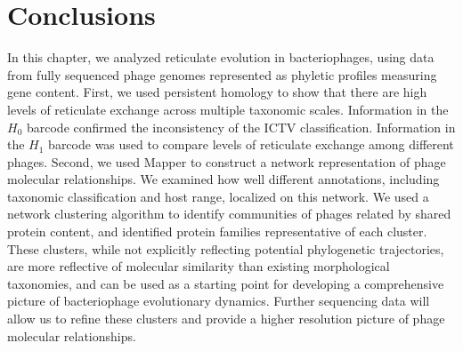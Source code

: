 \section{Conclusions}
\label{phage:sec:conclusions}

In this chapter, we analyzed reticulate evolution in bacteriophages, using data from fully sequenced phage genomes represented as phyletic profiles measuring gene content.
First, we used persistent homology to show that there are high levels of reticulate exchange across multiple taxonomic scales.
Information in the $H_0$ barcode confirmed the inconsistency of the ICTV classification.
Information in the $H_1$ barcode was used to compare levels of reticulate exchange among different phages.
Second, we used Mapper to construct a network representation of phage molecular relationships.
We examined how well different annotations, including taxonomic classification and host range, localized on this network.
We used a network clustering algorithm to identify communities of phages related by shared protein content, and identified protein families representative of each cluster.
These clusters, while not explicitly reflecting potential phylogenetic trajectories, are more reflective of molecular similarity than existing morphological taxonomies, and can be used as a starting point for developing a comprehensive picture of bacteriophage evolutionary dynamics.
Further sequencing data will allow us to refine these clusters and provide a higher resolution picture of phage molecular relationships.
